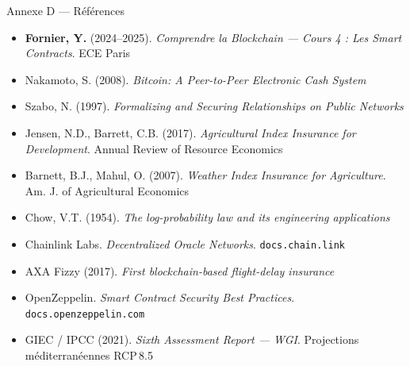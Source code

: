 \documentclass[aspectratio=169, 10pt, t]{beamer}
\begin{document}
\begin{frame}{Annexe D --- Références}
  \footnotesize
  \begin{itemize}
    \setlength{\itemsep}{3pt}
    \item \textbf{Fornier, Y.} (2024--2025). \textit{Comprendre la Blockchain --- Cours 4 : Les Smart Contracts}. ECE Paris
    \item Nakamoto, S. (2008). \textit{Bitcoin: A Peer-to-Peer Electronic Cash System}
    \item Szabo, N. (1997). \textit{Formalizing and Securing Relationships on Public Networks}
    \item Jensen, N.D., Barrett, C.B. (2017). \textit{Agricultural Index Insurance for Development}. Annual Review of Resource Economics
    \item Barnett, B.J., Mahul, O. (2007). \textit{Weather Index Insurance for Agriculture}. Am. J. of Agricultural Economics
    \item Chow, V.T. (1954). \textit{The log-probability law and its engineering applications}
    \item Chainlink Labs. \textit{Decentralized Oracle Networks}. \texttt{docs.chain.link}
    \item AXA Fizzy (2017). \textit{First blockchain-based flight-delay insurance}
    \item OpenZeppelin. \textit{Smart Contract Security Best Practices}. \texttt{docs.openzeppelin.com}
    \item GIEC / IPCC (2021). \textit{Sixth Assessment Report --- WGI}. Projections méditerranéennes RCP\,8.5
  \end{itemize}
\end{frame}
\end{document}
